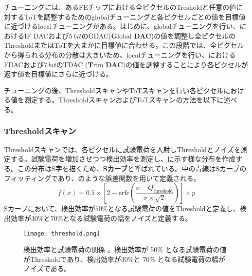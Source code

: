 チューニングには、あるFEチップにおける全ピクセルのTresholdと任意の値に対するToTを調整するためのglobalチューニングと各ピクセルごとの値を目標値に近づけるlocalチューニングがある。はじめに、globalチューニングを行い、におけるIF DACおよび$5\ \si{bit}$のGDAC(\textbf{G}lobal \textbf{DAC})の値を調整し全ピクセルのThresholdまたはToTを大まかに目標値に合わせる。この段階では、全ピクセルから得られる分布の分散は大きいため、localチューニングを行い、におけるFDACおよび$7\ \si{bit}$のTDAC (\textbf{T}rim \textbf{DAC})の値を調整することにより各ピクセルが返す値を目標値にさらに近づける。

チューニングの後、ThresholdスキャンやToTスキャンを行い各ピクセルにおける値を測定する。ThresholdスキャンおよびToTスキャンの方法を以下に述べる。

\subsubsection{Thresholdスキャン}
\label{sec:thresholdscan}
Thresholdスキャンでは、各ピクセルに試験電荷を入射しThresholdとノイズを測定する。試験電荷を増加させつつ検出効率を測定し、に示す様な分布を作成する。この分布はS字を描くため、\textbf{Sカーブ}と呼ばれている。中の青線はSカーブのフィッティングであり、のような誤差関数を用いて定義される。
\begin{equation}
  \label{eq:gosakannsuu}
  f(x)=0.5\times\left[ 2-\mathrm{erfc}\left( \frac{x-Q_\mathrm{threshold}}{\sigma \times \sqrt{2}} \right)  \right] \times p
\end{equation}
Sカーブにおいて、検出効率が$50\%$となる試験電荷の値をThresholdと定義し、検出効率が$30\%$と$70\%$となる試験電荷の幅をノイズと定義する。

\begin{figure}[tbp]
  \centering
  \texttt{[image: threshold.png]}
  \caption[検出効率と試験電荷の関係]{検出効率と試験電荷の関係 \cite{calibsoft}。検出効率が 50\% となる試験電荷の値がThresholdであり、検出効率が30\%と 70\% となる試験電荷の幅がノイズである。}
  \label{fig:threshold}
\end{figure}


